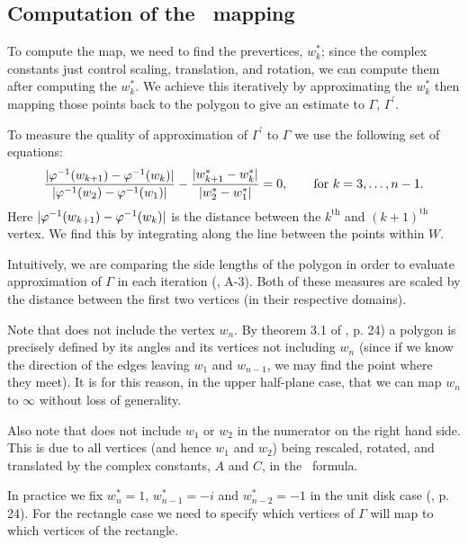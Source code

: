 \subsection{Computation of the \sch\ mapping}

To compute the map, we need to find the prevertices, $w^*_k$; since the complex constants just control scaling, translation, and rotation, we can compute them after computing the $w^*_k$. We achieve this iteratively by approximating the $w^*_k$ then mapping those points back to the polygon to give an estimate to $\Gamma$, $\Gamma^\prime$. 

To measure the quality of approximation of $\Gamma^\prime$ to $\Gamma$ we use the following set of equations:
\begin{equation}
\label{optimizeme}
\frac{\vert \varphi^{-1}(w_{k+1}) -  \varphi^{-1}(w_k) \vert}{\vert \varphi^{-1}(w_2)-\varphi^{-1}(w_1)\vert} - \frac{\vert w^*_{k+1} - w^*_k\vert}{\vert w^*_2 - w^*_1\vert} = 0, \qquad \text{for } k=3,\dots,n-1.
\end{equation}
Here $\vert \varphi^{-1}(w_{k+1}) -  \varphi^{-1}(w_k) \vert$ is the distance between the $k^{\text{th}}$ and $(k+1)^{\text{th}}$ vertex.  We find this by integrating along the line between the points within $W$.

Intuitively, we are comparing the side lengths of the polygon in order to evaluate approximation of $\Gamma$ in each iteration (\cite{snider}, A-3). Both of these measures are scaled by the distance between the first two vertices (in their respective domains).

Note that  does not include the vertex $w_n$. By theorem 3.1 of \cite{driscoll}, p. 24) a polygon is precisely defined by its angles and its vertices not including $w_n$ (since if we know the direction of the edges leaving $w_1$ and $w_{n-1}$, we may find the point where they meet). It is for this reason, in the upper half-plane case, that we can map $w_n$ to $\infty$ without loss of generality.

Also note that  does not include $w_1$ or $w_2$ in the numerator on the right hand side. This is due to all vertices (and hence $w_1$ and $w_2$) being rescaled, rotated, and translated by the complex constants, $A$ and $C$, in the \sch\ formula.

In practice we fix $w^*_n=1$, $w^*_{n-1}=-i$ and $w^*_{n-2}=-1$ in the unit disk case (\cite{driscoll}, p. 24). For the rectangle case we need to specify which vertices of $\Gamma$ will map to which vertices of the rectangle.

